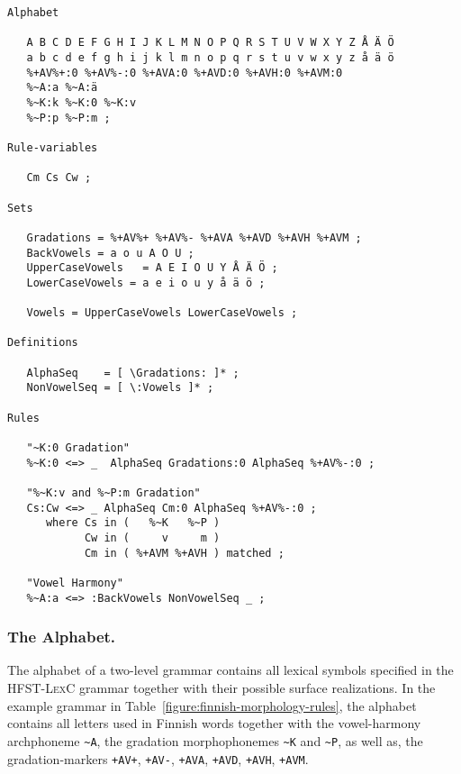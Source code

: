 \documentclass[postprint]{flammie}
\begin{document}
\begin{table}[!h]
\begin{verbatim}
Alphabet

   A B C D E F G H I J K L M N O P Q R S T U V W X Y Z Å Ä Ö
   a b c d e f g h i j k l m n o p q r s t u v w x y z å ä ö
   %+AV%+:0 %+AV%-:0 %+AVA:0 %+AVD:0 %+AVH:0 %+AVM:0 
   %~A:a %~A:ä 
   %~K:k %~K:0 %~K:v 
   %~P:p %~P:m ;

Rule-variables

   Cm Cs Cw ;

Sets

   Gradations = %+AV%+ %+AV%- %+AVA %+AVD %+AVH %+AVM ; 
   BackVowels = a o u A O U ;
   UpperCaseVowels   = A E I O U Y Å Ä Ö ;
   LowerCaseVowels = a e i o u y å ä ö ;

   Vowels = UpperCaseVowels LowerCaseVowels ;

Definitions

   AlphaSeq    = [ \Gradations: ]* ;
   NonVowelSeq = [ \:Vowels ]* ;

Rules

   "~K:0 Gradation"
   %~K:0 <=> _  AlphaSeq Gradations:0 AlphaSeq %+AV%-:0 ;

   "%~K:v and %~P:m Gradation"
   Cs:Cw <=> _ AlphaSeq Cm:0 AlphaSeq %+AV%-:0 ;
      where Cs in (   %~K   %~P )
            Cw in (     v     m )
            Cm in ( %+AVM %+AVH ) matched ;

   "Vowel Harmony"
   %~A:a <=> :BackVowels NonVowelSeq _ ;

\end{verbatim}
\caption{An example \textsc{HFST-TwolC} grammar governing the surface
realizations of the forms presented in the example lexicon in
Table~\ref{fig:finnish-lexc}.}\label{figure:finnish-morphology-rules}
\end{table}

\subsubsection{The Alphabet.}

The alphabet of a two-level grammar contains all lexical symbols
specified in the \textsc{HFST-LexC} grammar together with their
possible surface realizations. In the example grammar in
Table~\ref{figure:finnish-morphology-rules}, the alphabet contains all
letters used in Finnish words together with the vowel-harmony
archphoneme \verb|~A|, the gradation morphophonemes \verb|~K| and
\verb|~P|, as well as, the gradation-markers \verb|+AV+|, \verb|+AV-|,
\verb|+AVA|, \verb|+AVD|, \verb|+AVH|, \verb|+AVM|.
\end{document}
